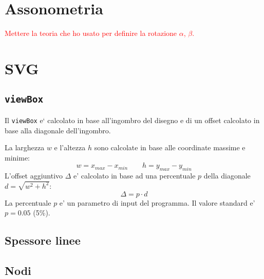 \documentclass[a4paper]{article}
\begin{document}
\section{Assonometria}

\textcolor{red}{Mettere la teoria che ho usato per definire la rotazione $\alpha$, $\beta$.}


\section{SVG}

\subsection{\texttt{viewBox}}

Il \texttt{viewBox} e` calcolato in base all'ingombro del disegno e di un offset calcolato in base alla diagonale dell'ingombro.


La larghezza $w$ e l'altezza $h$ sono calcolate in base alle coordinate massime e minime:
$$ w = x_{max} - x_{min} \qquad h = y_{max} - y_{min} $$
L'offset aggiuntivo $\Delta$ e' calcolato in base ad una percentuale $p$ della diagonale $d=\sqrt{w^2+h^2}$:
$$ \Delta = p \cdot d $$
La percentuale $p$ e' un parametro di input del programma. Il valore standard e' $p=0.05$ (5\%).


\subsection{Spessore linee}


\subsection{Nodi}
\end{document}
